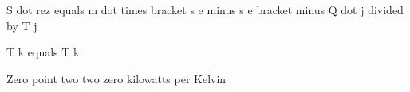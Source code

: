S dot rez equals m dot times bracket s e minus s e bracket minus Q dot j divided by T j

T k equals T k

Zero point two two zero kilowatts per Kelvin